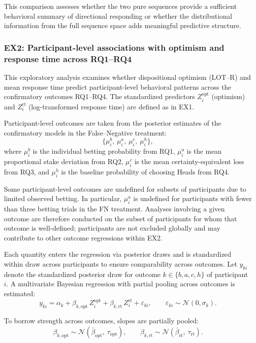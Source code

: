 \documentclass[11pt,a4paper]{article}
\numberwithin{equation}{section}
\begin{document}
This comparison assesses whether the two pure sequences provide a sufficient 
behavioral summary of directional responding or whether the distributional 
information from the full sequence space adds meaningful predictive structure.



\subsubsection{EX2: Participant-level associations with optimism and response time across RQ1--RQ4}
\label{Sec:Ex2}

This exploratory analysis examines whether dispositional optimism (LOT--R) and mean response time 
predict participant-level behavioral patterns across the confirmatory outcomes RQ1--RQ4.  
The standardized predictors \(Z_i^{\text{opt}}\) (optimism) and \(Z_i^{\text{rt}}\) (log-transformed 
response time) are defined as in EX1.

Participant-level outcomes are taken from the posterior estimates of the confirmatory models in the 
False--Negative treatment:
\[
\Big\{
\mu_i^{b},\ 
\mu_i^{a},\ 
\mu_i^{c},\ 
\mu_i^{h}
\Big\},
\]
where 
\(\mu_i^{b}\) is the individual betting probability from RQ1,  
\(\mu_i^{a}\) is the mean proportional stake deviation from RQ2,  
\(\mu_i^{c}\) is the mean certainty-equivalent loss from RQ3, and  
\(\mu_i^{h}\) is the baseline probability of choosing Heads from RQ4.  

Some participant-level outcomes are undefined for subsets of participants due to
limited observed betting. In particular, $\mu_i^{a}$ is undefined for
participants with fewer than three betting trials in the FN treatment.
Analyses involving a given outcome are therefore conducted on the subset of
participants for whom that outcome is well-defined; participants are not
excluded globally and may contribute to other outcome regressions within EX2.

Each quantity enters the regression via posterior draws and is standardized within draw across 
participants to ensure comparability across outcomes. Let \(y_{ki}\) denote the standardized 
posterior draw for outcome \(k \in \{b, a, c, h\}\) of participant \(i\). A multivariate Bayesian 
regression with partial pooling across outcomes is estimated:
\[
y_{ki}
= \alpha_k
+ \beta_{k,\mathrm{opt}}\, Z_i^{\text{opt}}
+ \beta_{k,\mathrm{rt}}\, Z_i^{\text{rt}}
+ \varepsilon_{ki},
\qquad 
\varepsilon_{ki}\sim \mathcal{N}(0,\sigma_k).
\]

To borrow strength across outcomes, slopes are partially pooled:
\[
\beta_{k,\mathrm{opt}} \sim \mathcal{N}(\bar{\beta}_{\mathrm{opt}},\ \tau_{\mathrm{opt}}), 
\qquad
\beta_{k,\mathrm{rt}} \sim \mathcal{N}(\bar{\beta}_{\mathrm{rt}},\ \tau_{\mathrm{rt}}).
\]
\end{document}
